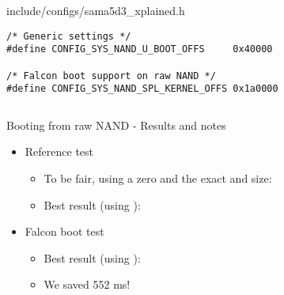 \begin{frame}[fragile]
\begin{columns}
        \begin{block}{include/configs/sama5d3\_xplained.h}
        \begin{verbatim}
/* Generic settings */
#define CONFIG_SYS_NAND_U_BOOT_OFFS     0x40000

/* Falcon boot support on raw NAND */
#define CONFIG_SYS_NAND_SPL_KERNEL_OFFS 0x1a0000
        \end{verbatim}
        \end{block}
   \end{columns}
\end{frame}

\begin{frame}{Booting from raw NAND - Results and notes}
  \small
  \begin{itemize}
     \item Reference test
        \begin{itemize}
           \item To be fair, using a zero  and the exact  and  size:\\
           \item Best result (using ):\\
        \end{itemize}
     \item Falcon boot test
        \begin{itemize}
           \item Best result (using ):\\
           \item We saved 552 ms!
        \end{itemize}
  \end{itemize}
\end{frame}

